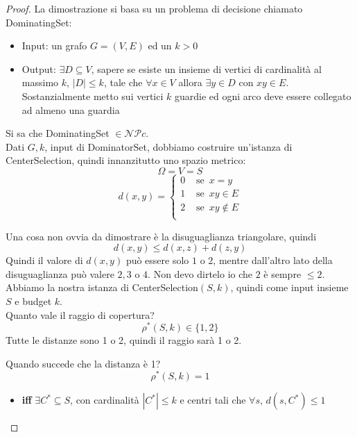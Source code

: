\documentclass[11pt]{article}
\begin{document}
	\begin{proof}
		La dimostrazione si basa su un problema di decisione chiamato DominatingSet: 
		\begin{itemize}
			\item Input: un grafo $G = (V, E)$ ed un $k>0$
			\item Output: $\exists D \subseteq V$, sapere se esiste un insieme di vertici di cardinalità al massimo $k$, $|D| \leq k$, tale che $\forall x \in V$ allora $\exists y \in D$ con $xy \in E$. Sostanzialmente metto sui vertici $k$ guardie ed ogni arco deve essere collegato ad almeno una guardia
		\end{itemize}
		
		Si sa che DominatingSet $\in \mathcal{NP}c$.\\
		
		Dati $G,k$, input di DominatorSet, dobbiamo costruire un'istanza di CenterSelection, quindi innanzitutto uno spazio metrico:
		$$ \Omega = V = S $$
		$$ d (x,y) = 
		\begin{cases}
			0 & \text{ se } \, x=y \\
			1 & \text{ se } \, xy \in E \\
			2 & \text{ se } \, xy \notin E \\
		\end{cases}
		$$
		
		Una cosa non ovvia da dimostrare è la disuguaglianza triangolare, quindi 
		$$ d(x,y) \leq d(x,z) + d(z,y) $$
		Quindi il valore di $ d(x,y)$ può essere solo $1$ o $2$, mentre dall'altro lato della disuguaglianza può valere $2,3$ o $4$. Non devo dirtelo io che $2$ è sempre $\leq 2$.\\
		
		Abbiamo la nostra istanza di CenterSelection$(S,k)$, quindi come input insieme $S$ e budget $k$. \\
		
		Quanto vale il raggio di copertura?
		$$ \rho^\ast (S,k) \in \{1,2\}$$
		Tutte le distanze sono 1 o 2, quindi il raggio sarà 1 o 2.\\
		
		\newpage
		
		Quando succede che la distanza è 1? 
		$$ \rho^\ast (S,k) = 1 $$
		\begin{itemize}[label*=]
			\item \textbf{iff} $\exists C^\ast \subseteq S$, con cardinalità $|C^\ast| \leq k$ e centri tali che $\forall s$, $d(s,C^\ast) \leq 1$ \\
			

\end{itemize}
\end{proof}
\end{document}
